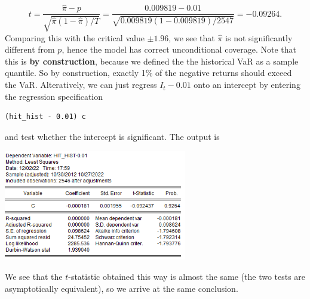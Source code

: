 \documentclass[11pt, a4paper]{article}
\begin{document}
\begin{enumerate}
\[
t=\frac{\hat{\pi}-p}{\sqrt{\hat{\pi}(1-\hat{\pi})/T}}=\frac{0.009819-0.01}{\sqrt{0.009819(1-0.009819)/2547}}=-0.09264.
\]
Comparing this with the critical value $\pm 1.96$, we see that $\hat\pi$ is not significantly different from $p$, hence the model has correct unconditional coverage. Note that this is \textbf{by construction}, because we defined the the historical VaR as a sample quantile. So by construction, exactly 1\% of the negative returns should exceed the VaR. Alteratively, we can just regress $I_t-0.01$ onto an intercept by entering the regression specification
\begin{verbatim}
(hit_hist - 0.01) c
\end{verbatim}
and test whether the intercept is significant. The output is
\begin{center}
\includegraphics[width=0.6\textwidth]{hit1}
\end{center}
We see that the $t$-statistic obtained this way is almost the same (the two tests are asymptotically equivalent), so we arrive at the same conclusion.


\end{enumerate}
\end{document}
